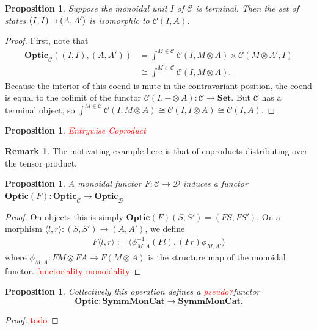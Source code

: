 \documentclass[11pt,a4paper]{article}
\theoremstyle{plain}
\newtheorem{proposition}[theorem]{Proposition}
\theoremstyle{definition}
\newtheorem{remark}[theorem]{Remark}
\newcommand{\C}{\mathscr{C}}
\newcommand{\D}{\mathscr{D}}
\newcommand{\Set}{\mathbf{Set}}
\newcommand{\SymmMonCat}{\mathbf{SymmMonCat}}
\newcommand{\Optic}{\mathbf{Optic}}
\newcommand{\hto}{\ensuremath{\,\mathaccent\shortmid\rightarrow\,}}
\newcommand{\todo}[1]{\textcolor{red}{\small #1}}
\begin{document}
\begin{proposition}
Suppose the monoidal unit $I$ of $\C$ is terminal. Then the set of states $(I, I) \hto (A, A')$ is isomorphic to $\C(I, A)$.
\end{proposition}
\begin{proof}
First, note that
\begin{align*}
\Optic_\C((I,I), (A,A')) 
&= \int^{M \in \C} \C(I, M \otimes A) \times \C(M \otimes A', I) \\
&\cong \int^{M \in \C} \C(I, M \otimes A).
\end{align*}
Because the interior of this coend is mute in the contravariant position, the coend is equal to the colimit of the functor $\C(I, - \otimes A) : \C \to \Set$. But $\C$ has a terminal object, so $\int^{M \in \C} \C(I, M \otimes A) \cong \C(I, I \otimes A) \cong \C(I, A)$.
\end{proof}

\begin{proposition}
\todo{Entrywise Coproduct}
\end{proposition}

\begin{remark}
The motivating example here is that of coproducts distributing over the tensor product.
\end{remark}

\begin{proposition}
A monoidal functor $F : \C \to \D$ induces a  functor $\Optic(F) : \Optic_\C \to \Optic_\D$
\end{proposition}
\begin{proof}
On objects this is simply $\Optic(F)(S, S') = (FS, FS')$. On a morphism $\langle l, r \rangle : (S, S') \to (A, A')$, we define
\begin{align*}
F\langle l, r \rangle := \langle \phi^{-1}_{M,A} (Fl), (Fr) \phi_{M,A'}\rangle
\end{align*}
where $\phi_{M,A} : FM \otimes FA \to F(M \otimes A)$ is the structure map of the monoidal functor.
\todo{functoriality}
\todo{monoidality}
\end{proof}

\begin{proposition}
\label{prop-optic-functor}
Collectively this operation defines a \todo{pseudo?}functor \[\Optic : \SymmMonCat \to \SymmMonCat.\]
\end{proposition}
\begin{proof}
\todo{todo}
\end{proof}
\end{document}
